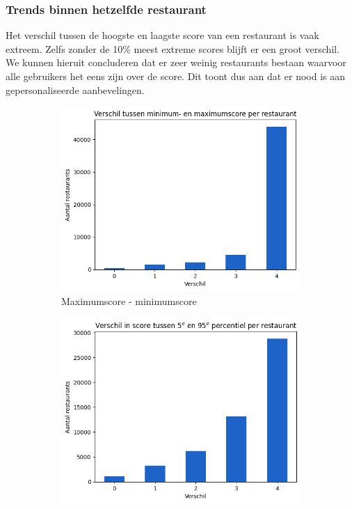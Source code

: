 \subsubsection{Trends binnen hetzelfde restaurant}
Het verschil tussen de hoogste en laagste score van een restaurant is vaak extreem. Zelfs zonder de 10\% meest extreme scores blijft er een groot verschil. We kunnen hieruit concluderen dat er zeer weinig restaurants bestaan waarvoor alle gebruikers het eens zijn over de score. Dit toont dus aan dat er nood is aan gepersonaliseerde aanbevelingen.
\begin{figure}[H]
    \begin{subfigure}{.5\textwidth}
        \centering
        \includegraphics[width=1\linewidth]{fig/chapt3/verdeling_score_min_max_restaurant.png}
        \caption{Maximumscore - minimumscore}
        \label{fig:chapt3_verdeling_score_min_max_restaurant}
    \end{subfigure}
    \begin{subfigure}{.5\textwidth}
        \centering
        \includegraphics[width=1\linewidth]{fig/chapt3/verdeling_score_min_max_percentiel_restaurant.png}

\end{subfigure}
\end{figure}
